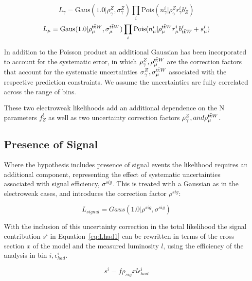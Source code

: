 \begin{equation}
L_{\gamma} = \textrm{Gaus}(1.0|\rho^{Z}_{\gamma}, \sigma^{Z}_{\gamma})  \prod_{i} \textrm{Pois}(n^{i}_{\gamma}|\rho^{Z}_{\gamma}r^{i}_{\gamma} b^{i}_{Z})
\label{eq:gaml}
\end{equation}
\begin{equation}
L_{\mu} = \textrm{Gaus}(1.0|\rho^{\textrm{t}\bar{\textrm{t}} W}_{\mu}, \sigma^{\textrm{t}\bar{\textrm{t}} W}_{\mu})  \prod_{i} \textrm{Pois}(n^{i}_{\mu}|\rho^{\textrm{t}\bar{\textrm{t}} W}_{\mu}r^{i}_{\mu} b^{i}_{\textrm{t}\bar{\textrm{t}} W} + s^{i}_{\mu})
  \label{eq:mul}
 \end{equation}


In addition to the Poisson product an additional Gaussian has been incorporated to account for the systematic error, in which $\rho^{Z}_{\gamma},\rho^{\textrm{t}\bar{\textrm{t}} W}_{\mu}$ are the correction factors that account for the systematic uncertainties $\sigma^{Z}_{\gamma},\sigma^{\textrm{t}\bar{\textrm{t}} W}_{\mu}$ associated with the respective prediction constraints. We assume the uncertainties are fully correlated across the range of bins. 

These two electroweak likelihoods add an additional dependence on the N parameters $f^{i}_{Z}$ as well as two uncertainty correction factors $\rho^{Z}_{\gamma}, and \rho^{\textrm{t}\bar{\textrm{t}} W}_{\mu}$. 

\subsection{Presence of Signal}

Where the hypothesis includes presence of signal events the likelihood requires an additional component, representing the effect of systematic uncertainties associated with signal efficiency, $\sigma^{sig}$. This is treated with a Gaussian as in the electroweak cases, and introduces the correction factor $\rho^{sig}$:

\begin{equation}
L_{signal} = Gaus(1.0 | \rho^{sig}, \sigma^{sig})
\label{ew:lsig}
\end{equation}

With the inclusion of this uncertainty correction in the total likelihood the signal contribution $s^{i}$ in Equation~\ref{eq:Lhad1} can be rewritten in terms of the cross-section $x$ of the model and the measured luminosity $l$, using the efficiency of the analysis in bin $i, \epsilon^{i}_{had}$. 

\begin{equation}
s^{i} = f \rho_{sig} x l \epsilon^{i}_{had}
\label{eq:sig}
\end{equation}

